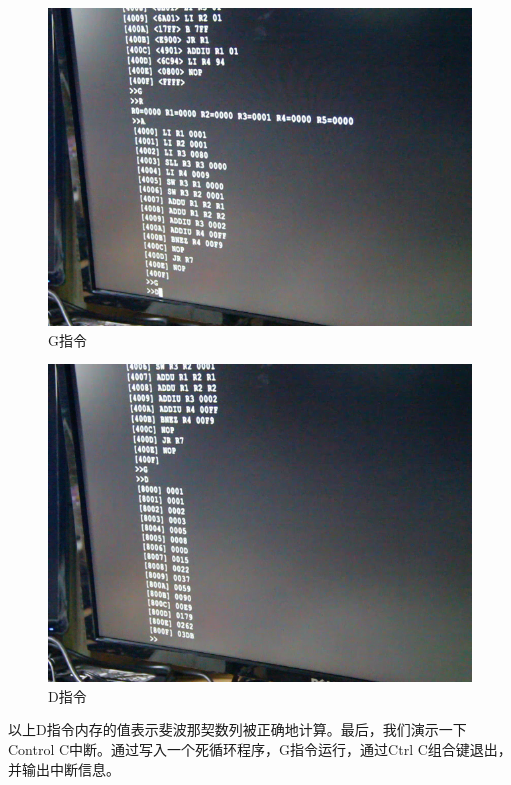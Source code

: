 \begin{figure}[H]
  \includegraphics[width=\linewidth]{Figures/picture/vlcsnap-2015-12-09-23h47m55s801.png}
  \caption{G指令}
\end{figure}

\begin{figure}[H]
  \includegraphics[width=\linewidth]{Figures/picture/vlcsnap-2015-12-09-23h48m01s993.png}
  \caption{D指令}
\end{figure}

以上D指令内存的值表示斐波那契数列被正确地计算。最后，我们演示一下Control C中断。通过写入一个死循环程序，G指令运行，通过Ctrl C组合键退出，并输出中断信息。


